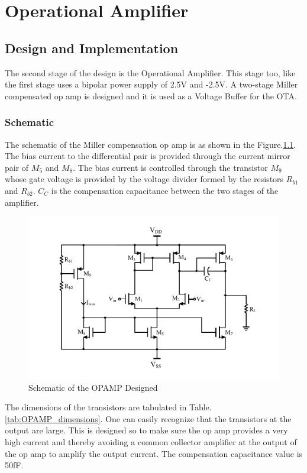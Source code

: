\chapter{Operational Amplifier}

\section{Design and Implementation}
The second stage of the design is the Operational Amplifier. This stage too, like the first stage uses a bipolar power supply of 2.5V and -2.5V. A two-stage Miller compensated op amp is designed and it is used as a Voltage Buffer for the OTA.
\subsection{Schematic}
The schematic of the Miller compensation op amp is as shown in the Figure.\ref{fig:OPAMP_Schematic}. The bias current to the differential pair is provided through the current mirror pair of $M_5$ and $M_8$. The bias current is controlled through the transistor $M_9$ whose gate voltage is provided by the voltage divider formed by the resistors $R_{b1}$ and $R_{b2}$. $C_C$ is the compensation capacitance between the two stages of the amplifier.
\begin{figure} [H]
\centering
\includegraphics[scale=1]{Figures/Schematics/OPAMP_Vbias.pdf}
\caption{Schematic of the OPAMP Designed}
\label{fig:OPAMP_Schematic}
\end{figure}

The dimensions of the transistors are tabulated in Table.\ref{tab:OPAMP_dimensions}. One can easily recognize that the transistors at the output are large. This is designed so to make sure the op amp provides a very high current and thereby avoiding a common collector amplifier at the output of the op amp to amplify the output current. The compensation capacitance value is 50fF.

